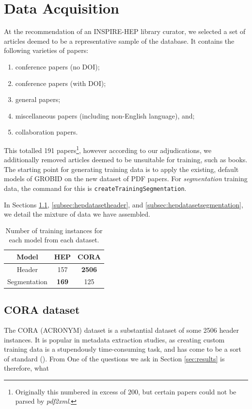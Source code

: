 \section{Data Acquisition}
\label{sec:data}

At the recommendation of an INSPIRE-HEP library curator, we selected a set of articles deemed to be a representative sample of the database. It contains the following varieties of papers:

\begin{enumerate}
\item conference papers (no DOI);
\item conference papers (with DOI);
\item general papers;
\item miscellaneous papers (including non-English language), and;
\item collaboration papers.
\end{enumerate}

This totalled 191 papers\footnote{Originally this numbered in excess of 200, but certain papers could not be parsed by \emph{pdf2xml}.}, however according to our adjudications, we additionally removed articles deemed to be unsuitable for training, such as books. The starting point for generating training data is to apply the existing, default models of GROBID on the new dataset of PDF papers. For \emph{segmentation} training data, the command for this is \texttt{createTrainingSegmentation}. 

In Sections \ref{subsec:cora}, \ref{subsec:hepdatasetheader}, and \ref{subsec:hepdatasetsegmentation}, we detail the mixture of data we have assembled.

\begin{table}[h]
\begin{center}
\begin{tabular}{|c|c|c|}
\hline
Model & HEP & CORA \\
\hline
Header & 157 & \textbf{2506} \\
\hline
Segmentation & \textbf{169} & 125 \\
\hline
\end{tabular}
\caption[Number of training instances for each model from each dataset.]{Number of training instances for each model from each dataset.}
\label{table:headervssegmentation}
\end{center}
\end{table}

\subsection{CORA dataset}
\label{subsec:cora}
The CORA (ACRONYM) dataset is a substantial dataset of some 2506 header instances. It is popular in metadata extraction studies, as creating custom training data is a stupendously time-consuming task, and has come to be a sort of standard (\cite{Peng04accurateinformation}). From One of the questions we ask in Section \ref{sec:results} is therefore, what 

